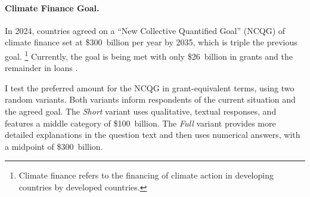 \documentclass[12pt,english]{article}
\begin{document}
\begin{bibunit}


\paragraph{Climate Finance Goal.}\label{par:ncqg}

In 2024, countries agreed on a ``New Collective Quantified Goal'' (NCQG) of climate finance set at \$300~billion per year by 2035, which is triple the previous goal.
\footnote{Climate finance refers to the financing of climate action in developing countries by developed countries. } %
Currently, the goal is being met with only \$26~billion in grants and the remainder in loans \citep{oecd_climate_2024}.

I test the preferred amount for the NCQG in grant-equivalent terms, using two random variants. Both variants inform respondents of the current situation and the agreed goal. %
The \textit{Short} variant uses qualitative, textual responses, and features a middle category of \$100~billion. %
The \textit{Full} variant provides more detailed explanations in the question text and then uses numerical answers, with a midpoint of \$300~billion.


\end{bibunit}
\end{document}
